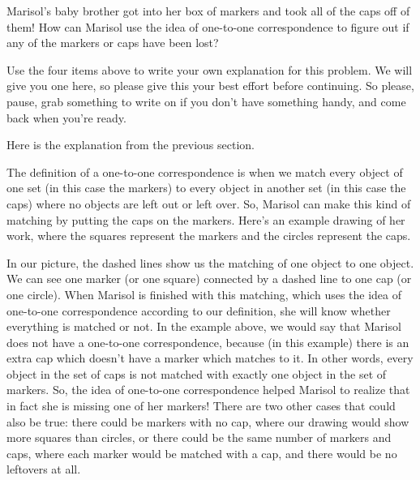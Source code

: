 \documentclass[noauthor,nooutcomes]{ximera}
\begin{document}
\begin{problem}
Marisol's baby brother got into her box of markers and took all of the caps off of them! How can Marisol  use the idea of one-to-one correspondence to figure out if any of the markers or caps have been lost?

\begin{prompt} %
Use the four items above to write your own explanation for this problem. We will give you one here, so please give this your best effort before continuing. So please, pause, grab something to write on if you don't have something handy, and come back when you're ready.

\begin{multipleChoice}
\end{multipleChoice}
\end{prompt}



\begin{problem} Here is the explanation from the previous section.


The definition of a one-to-one correspondence is when we match every object of one set (in this case the markers) to every object in another set (in this case the caps) where no objects are left out or left over. So, Marisol can make this kind of matching by putting the caps on the markers. Here's an example drawing of her work, where the squares represent the markers and the circles represent the caps.
\begin{center}
\end{center}
In our picture, the dashed lines show us the matching of one object to one object. We can see one marker (or one square) connected by a dashed line to one cap (or one circle). When Marisol is finished with this matching, which uses the idea of one-to-one correspondence according to our definition, she will know whether everything is matched or not. In the example above, we would say that Marisol does not have a one-to-one correspondence, because (in this example) there is an extra cap which doesn't have a marker which matches to it. In other words, every object in the set of caps is not matched with exactly one object in the set of markers. So, the idea of one-to-one correspondence helped Marisol to realize that in fact she is missing one of her markers! There are two other cases that could also be true: there could be markers with no cap, where our drawing would show more squares than circles, or there could be the same number of markers and caps, where each marker would be matched with a cap, and there would be no leftovers at all.


\end{problem}
\end{problem}
\end{document}
